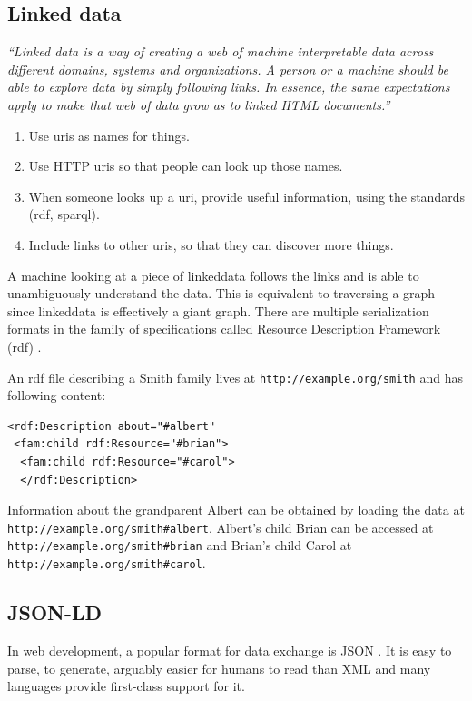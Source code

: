 \subsection{Linked data}\label{linkeddata}
\textit{``Linked data is a way of creating a web of machine interpretable data across different domains, systems and organizations. A person or a machine should be able to explore data by simply following links. In essence, the same expectations apply to make that web of data grow as to linked HTML documents.''} \citep{linkedatafourrules}

\begin{enumerate}
  \item Use \gls{uri}s as names for things.
  \item Use HTTP \gls{uri}s so that people can look up those names.
  \item When someone looks up a \gls{uri}, provide useful information, using the standards (\gls{rdf}, \gls{sparql}).
  \item Include links to other \gls{uri}s, so that they can discover more things.
\end{enumerate}
\citep{linkedatafourrules}

A machine looking at a piece of \gls{linkeddata} follows the links and is able to unambiguously understand the data. This is equivalent to traversing a graph since \gls{linkeddata} is effectively a giant graph. There are multiple serialization formats in the family of specifications called Resource Description Framework (\gls{rdf}) \citep{rdfspecification}.

An \gls{rdf} file describing a Smith family lives at \lstinline{http://example.org/smith} and has following content:

\lstset{language=XML}
\begin{lstlisting}[caption= Simple example of a person as \gls{rdf}, label=rdfexample]
<rdf:Description about="#albert"
 <fam:child rdf:Resource="#brian">
  <fam:child rdf:Resource="#carol">
  </rdf:Description>
\end{lstlisting}

Information about the grandparent Albert can be obtained by loading the data at \\ \lstinline{http://example.org/smith#albert}. Albert's child Brian can be accessed at \lstinline{http://example.org/smith#brian} and Brian's child Carol at \lstinline{http://example.org/smith#carol}.

\subsection{JSON-LD}\label{jsonld}
In web development, a popular format for data exchange is JSON \citep{jsonformat}. It is easy to parse, to generate, arguably easier for humans to read than XML and many languages provide first-class support for it.

